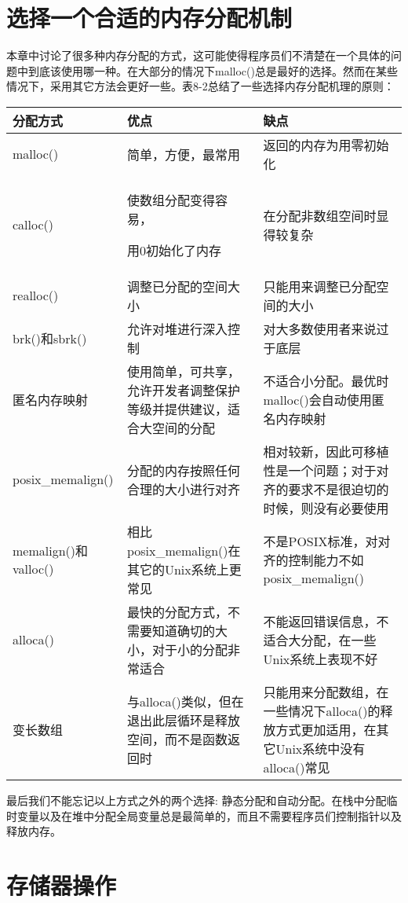 \section{选择一个合适的内存分配机制}

本章中讨论了很多种内存分配的方式，这可能使得程序员们不清楚在一个具体的问题中到底该使用哪一种。在大部分的情况下malloc()总是最好的选择。然而在某些情况下，采用其它方法会更好一些。表8-2总结了一些选择内存分配机理的原则： 

\begin{center}
\begin{tabular}{p{3cm}p{5cm}p{5cm}}
  \toprule [1pt]
  \rowcolor[gray]{.9}
    分配方式 & 优点 & 缺点 \\
  \midrule
    malloc() & 简单，方便，最常用 & 返回的内存为用零初始化   \\
    calloc() & 使数组分配变得容易，
	
	用0初始化了内存 & 在分配非数组空间时显得较复杂   \\
    realloc() & 调整已分配的空间大小 & 只能用来调整已分配空间的大小  \\
    brk()和sbrk() & 允许对堆进行深入控制 & 对大多数使用者来说过于底层  \\
    匿名内存映射 & 使用简单，可共享，允许开发者调整保护等级并提供建议，适合大空间的分配 & 不适合小分配。最优时malloc()会自动使用匿名内存映射 \\
    posix\_memalign() & 分配的内存按照任何合理的大小进行对齐 & 相对较新，因此可移植性是一个问题；对于对齐的要求不是很迫切的时候，则没有必要使用\\
    memalign()和valloc() & 相比posix\_memalign()在其它的Unix系统上更常见 & 不是POSIX标准，对对齐的控制能力不如posix\_memalign() \\
    alloca() & 最快的分配方式，不需要知道确切的大小，对于小的分配非常适合 & 不能返回错误信息，不适合大分配，在一些Unix系统上表现不好 \\
    变长数组 & 与alloca()类似，但在退出此层循环是释放空间，而不是函数返回时 & 只能用来分配数组，在一些情况下alloca()的释放方式更加适用，在其它Unix系统中没有alloca()常见 \\
  \bottomrule[1pt]
\end{tabular}
\end{center}

最后我们不能忘记以上方式之外的两个选择: 静态分配和自动分配。在栈中分配临时变量以及在堆中分配全局变量总是最简单的，而且不需要程序员们控制指针以及释放内存。 

\section{存储器操作}

